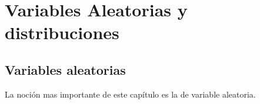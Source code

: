 \chapter{Variables Aleatorias y distribuciones}%
\label{cha:VariablesAl-distribuciones}

\section{Variables aleatorias}%
\label{sec:Variables-aleatorias}

La noción mas importante de este capítulo es la de variable aleatoria.
